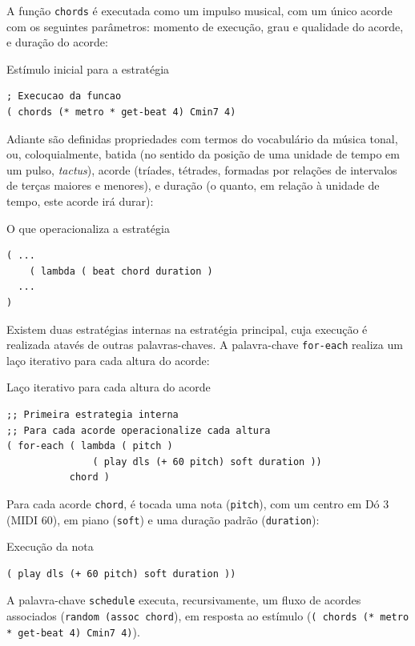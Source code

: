 A função \verb|chords| é executada como um impulso musical, com um único acorde com os seguintes parâmetros: momento de execução, grau e qualidade do acorde, e duração do acorde:

\begin{example}{Estímulo inicial para a estratégia}
\begin{verbatim}
; Execucao da funcao
( chords (* metro * get-beat 4) Cmin7 4)
\end{verbatim}
\end{example}


Adiante são definidas propriedades com termos do vocabulário da música tonal, ou, coloquialmente, batida (no sentido da posição de uma unidade de tempo em um pulso, \emph{tactus}), acorde (tríades, tétrades, formadas por relações de intervalos de terças maiores e menores), e duração (o quanto, em relação à unidade de tempo, este acorde irá durar):

\begin{example}{O que operacionaliza a estratégia}
\begin{verbatim}
( ...
    ( lambda ( beat chord duration )
  ...
)    
\end{verbatim}
\end{example}

Existem duas estratégias internas na estratégia principal, cuja execução é realizada atavés de outras palavras-chaves. A palavra-chave \verb|for-each| realiza um laço iterativo para cada altura do acorde:

\begin{example}{Laço iterativo para cada altura do acorde}
\begin{verbatim}
;; Primeira estrategia interna 
;; Para cada acorde operacionalize cada altura
( for-each ( lambda ( pitch )
               ( play dls (+ 60 pitch) soft duration ))
           chord )
\end{verbatim}
\end{example}

Para cada acorde \verb|chord|, é tocada uma nota (\verb|pitch|), com um centro em Dó 3 (MIDI 60), em piano (\verb|soft|) e uma duração padrão (\verb|duration|):

\begin{example}{Execução da nota}
\begin{verbatim}
( play dls (+ 60 pitch) soft duration ))
\end{verbatim}
\end{example}
A palavra-chave \verb|schedule| executa, recursivamente, um fluxo de acordes associados (\verb|random (assoc chord|), em resposta ao estímulo (\verb|( chords (* metro * get-beat 4) Cmin7 4)|). 

